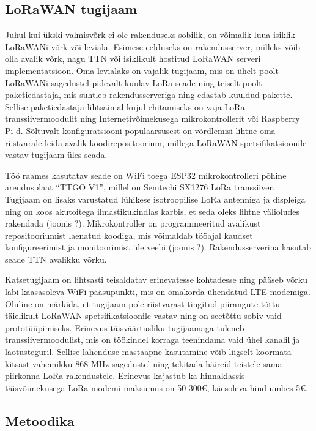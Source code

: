 \documentclass[12pt]{article}
\begin{document}
\subsection{LoRaWAN tugijaam}

Juhul kui ükski valmisvõrk ei ole rakenduseks sobilik, on võimalik luua isiklik LoRaWANi võrk või leviala.
Esimese eelduseks on rakendusserver, milleks võib olla avalik võrk, nagu TTN või isiklikult hostitud LoRaWAN serveri implementatsioon.
Oma levialaks on vajalik tugijaam, mis on ühelt poolt LoRaWANi sagedustel pidevalt kuulav LoRa seade ning teiselt poolt paketiedastaja, mis suhtleb rakendusserveriga ning edastab kuuldud pakette.
Sellise paketiedastaja lihtsaimal kujul ehitamiseks on vaja LoRa transsiivermoodulit ning Internetivõimekusega mikrokontrollerit või Raspberry Pi-d.
Sõltuvalt konfiguratsiooni populaarsusest on võrdlemisi lihtne oma riistvarale leida avalik koodirepositoorium, millega LoRaWAN spetsifikatsioonile vastav tugijaam üles seada.

Töö raames kasutatav seade on WiFi toega ESP32 mikrokontrolleri põhine arendusplaat “TTGO V1”, millel on Semtechi SX1276 LoRa transsiiver.
Tugijaam on lisaks varustatud lühikese isotroopilise LoRa antenniga ja displeiga ning on koos akutoitega ilmastikukindlas karbis, et seda oleks lihtne välioludes rakendada (joonis ?).
Mikrokontroller on programmeeritud avalikust repositooriumist laenatud koodiga, mis võimaldab tööajal kaudset konfigureerimist ja monitoorimist üle veebi (joonis ?).
Rakendusserverina kasutab seade TTN avalikku võrku.

Katsetugijaam on lihtsasti teisaldatav erinevatesse kohtadesse ning pääseb võrku läbi kaasasoleva WiFi pääsupunkti, mis on omakorda ühendatud LTE modemiga.
Oluline on märkida, et tugijaam pole riistvarast tingitud piirangute tõttu täielikult LoRaWAN spetsifikatsioonile vastav ning on seetõttu sobiv vaid prototüüpimiseks.
Erinevus täisväärtusliku tugijaamaga tuleneb transsiivermoodulist, mis on töökindel korraga teenindama vaid ühel kanalil ja laotusteguril.
Sellise lahenduse mastaapne kasutamine võib liigselt koormata kitsast vahemikku 868 MHz sagedustel ning tekitada häireid teistele sama piirkonna LoRa rakendustele.
Erinevus kajastub ka hinnaklassis — täisvõimekusega LoRa modemi maksumus on 50-300€, käesoleva hind umbes 5€.

\subsection{Metoodika}
\end{document}
